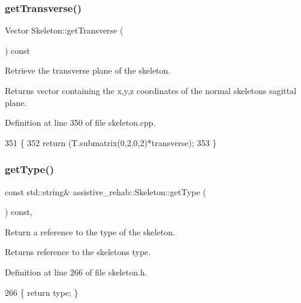 \subsubsection{\texorpdfstring{get\+Transverse()}{getTransverse()}}
{\footnotesize\ttfamily Vector Skeleton\+::get\+Transverse (\begin{DoxyParamCaption}{ }\end{DoxyParamCaption}) const\hspace{0.3cm}{\ttfamily [inherited]}}



Retrieve the transverse plane of the skeleton. 

\begin{DoxyReturn}{Returns}
vector containing the x,y,z coordinates of the normal skeleton\textquotesingle{}s sagittal plane. 
\end{DoxyReturn}


Definition at line 350 of file skeleton.\+cpp.


\begin{DoxyCode}
351 \{
352     \textcolor{keywordflow}{return} (T.submatrix(0,2,0,2)*transverse);
353 \}
\end{DoxyCode}
\mbox{\label{classassistive__rehab_1_1Skeleton_a4efc4844bd2b185f1080ee52ab69cb04}} 
\subsubsection{\texorpdfstring{get\+Type()}{getType()}}
{\footnotesize\ttfamily const std\+::string\& assistive\+\_\+rehab\+::\+Skeleton\+::get\+Type (\begin{DoxyParamCaption}{ }\end{DoxyParamCaption}) const\hspace{0.3cm}{\ttfamily [inline]}, {\ttfamily [inherited]}}



Return a reference to the type of the skeleton. 

\begin{DoxyReturn}{Returns}
reference to the skeleton\textquotesingle{}s type. 
\end{DoxyReturn}


Definition at line 266 of file skeleton.\+h.


\begin{DoxyCode}
266 \{ \textcolor{keywordflow}{return} type; \}
\end{DoxyCode}
\mbox{\label{classassistive__rehab_1_1Skeleton_a7753cc8d2b43e27eaf7bf9ef640a99cb}} 
